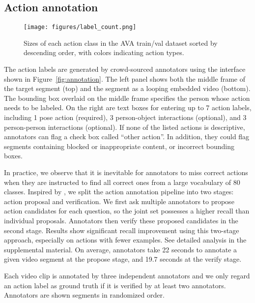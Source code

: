 \documentclass[10pt,twocolumn,letterpaper]{article}
\begin{document}
\subsection{Action annotation}
\label{sec:action_label}

\begin{figure*}[tb!]
    \centering
    \texttt{[image: figures/label\_count.png]}
    \vspace{-1em}
    \caption{Sizes of each action class in the AVA train/val dataset sorted by descending order, with colors indicating action types.}
    \label{fig:label_counts_top}
    \vspace{-1em}
\end{figure*}

The action labels are generated by crowd-sourced annotators using the interface shown in {Figure~\ref{fig:annotation}}. The left panel shows both the middle frame of the target segment (top) and the segment as a looping embedded video (bottom). The bounding box overlaid on the middle frame specifies the person whose action needs to be labeled. On the right are text boxes for entering up to 7 action labels, including 1 pose action (required), 3 person-object interactions (optional), and 3 person-person interactions (optional). If none of the listed actions is descriptive, annotators can flag a check box called ``other action''. In addition, they could flag segments containing blocked or inappropriate content, or incorrect bounding boxes. 

In practice, we observe that it is inevitable for annotators to miss correct actions when they are instructed to find all correct ones from a large vocabulary of 80 classes. Inspired by \cite{Sigurdsson_HCOMP2016}, we split the action annotation pipeline into two stages: action proposal and verification. We first ask multiple annotators to propose action candidates for each question, so the joint set possesses a higher recall than individual proposals. Annotators then verify these proposed candidates in the second stage. Results show significant recall improvement using this two-stage approach, especially on actions with fewer examples. See detailed analysis in the supplemental material. On average, annotators take 22 seconds to annotate a given video segment at the propose stage, and 19.7 seconds at the verify stage.  

Each video clip is annotated by three independent annotators and we only regard an action label as ground truth if it is verified by at least two annotators. Annotators are shown segments in randomized order.
\end{document}

